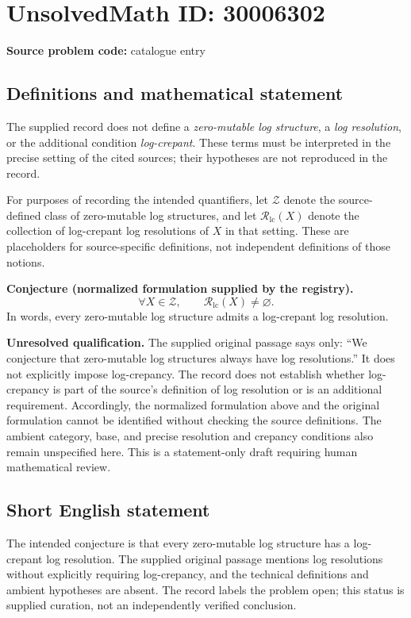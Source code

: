 \documentclass[11pt]{article}
\begin{document}
\section*{UnsolvedMath ID: 30006302}
\textbf{Source problem code:} catalogue entry
\subsection{Definitions and mathematical statement}
The supplied record does not define a \emph{zero-mutable log structure}, a \emph{log resolution}, or the additional condition \emph{log-crepant}. These terms must be interpreted in the precise setting of the cited sources; their hypotheses are not reproduced in the record.

For purposes of recording the intended quantifiers, let \(\mathcal Z\) denote the source-defined class of zero-mutable log structures, and let \(\mathcal R_{\mathrm{lc}}(X)\) denote the collection of log-crepant log resolutions of \(X\) in that setting. These are placeholders for source-specific definitions, not independent definitions of those notions.

\textbf{Conjecture (normalized formulation supplied by the registry).}
\[
\forall X\in\mathcal Z,\qquad \mathcal R_{\mathrm{lc}}(X)\ne\varnothing.
\]
In words, every zero-mutable log structure admits a log-crepant log resolution.

\textbf{Unresolved qualification.} The supplied original passage says only: ``We conjecture that zero-mutable log structures always have log resolutions.'' It does not explicitly impose log-crepancy. The record does not establish whether log-crepancy is part of the source's definition of log resolution or is an additional requirement. Accordingly, the normalized formulation above and the original formulation cannot be identified without checking the source definitions. The ambient category, base, and precise resolution and crepancy conditions also remain unspecified here. This is a statement-only draft requiring human mathematical review.
\subsection{Short English statement}
The intended conjecture is that every zero-mutable log structure has a log-crepant log resolution. The supplied original passage mentions log resolutions without explicitly requiring log-crepancy, and the technical definitions and ambient hypotheses are absent. The record labels the problem open; this status is supplied curation, not an independently verified conclusion.
\end{document}

